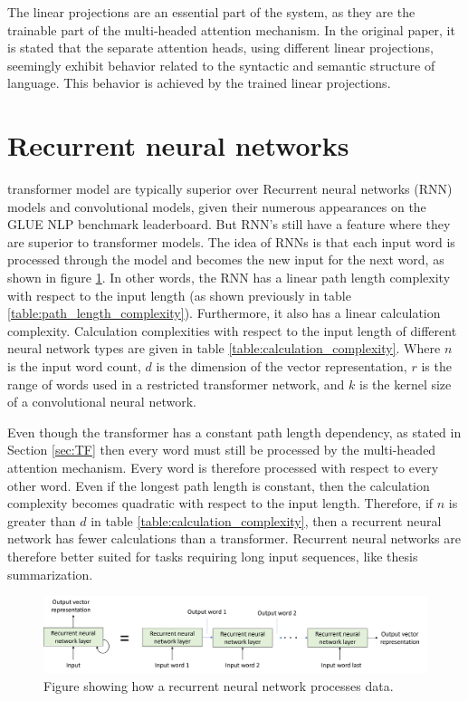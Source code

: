 The linear projections are an essential part of the system, as they are the trainable part of the multi-headed attention mechanism. In the original paper\cite{46201}, it is stated that the separate attention heads, using different linear projections, seemingly exhibit behavior related to the syntactic and semantic structure of language. This behavior is achieved by the trained linear projections.

\section{Recurrent neural networks}
transformer model are typically superior over Recurrent neural networks (RNN) models and convolutional models, given their numerous appearances on the GLUE NLP benchmark leaderboard\cite{wang2018glue}. But RNN's still have a feature where they are superior to transformer models.
The idea of RNNs is that each input word is processed through the model and becomes the new input for the next word, as shown in figure \ref{fig:RNN_figure}.
In other words, the RNN has a linear path length complexity with respect to the input length (as shown previously in table \ref{table:path_length_complexity}). Furthermore, it also has a linear calculation complexity. Calculation complexities with respect to the input length of different neural network types are given in table \ref{table:calculation_complexity}. Where $n$ is the input word count, $d$ is the dimension of the vector representation, $r$ is the range of words used in a restricted transformer network, and $k$ is the kernel size of a convolutional neural network. 

Even though the transformer has a constant path length dependency, as stated in Section \ref{sec:TF} then every word must still be processed by the multi-headed attention mechanism. Every word is therefore processed with respect to every other word. Even if the longest path length is constant, then the calculation complexity becomes quadratic with respect to the input length. 
Therefore, if $n$ is greater than $d$ in table \ref{table:calculation_complexity}, then a recurrent neural network has fewer calculations than a transformer. Recurrent neural networks are therefore better suited for tasks requiring long input sequences, like thesis summarization.

\begin{figure}[h]
    \centering
    \includegraphics[width=12cm]{img/RNN_model_design.png}
    
    \caption{Figure showing how a recurrent neural network processes data.}
    \label{fig:RNN_figure}
\end{figure}

